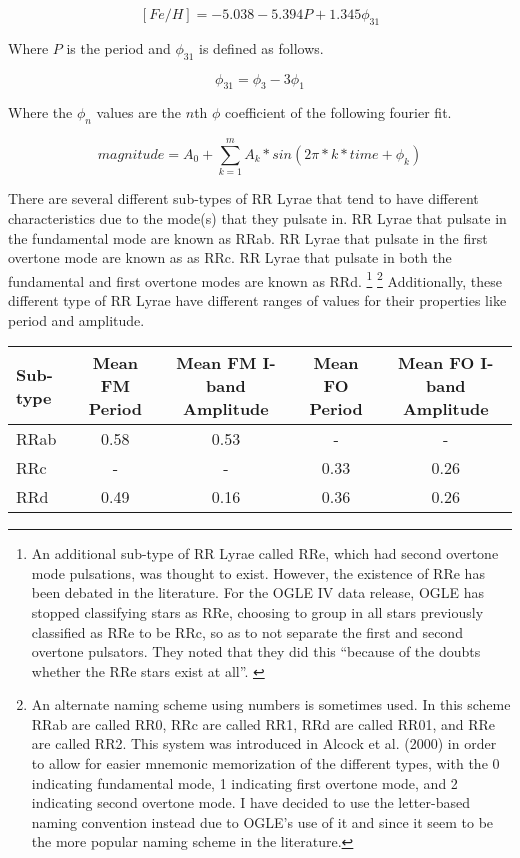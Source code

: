 \documentclass[]{article}
\begin{document}
$$
[Fe/H] = -5.038 - 5.394 P + 1.345 \phi_{31}
$$

Where $P$ is the period and $\phi_{31}$ is defined as follows. \cite{bhardwaj_2018}

$$
\phi_{31} = \phi_{3} - 3\phi_{1}
$$

Where the $\phi_{n}$ values are the $n$th $\phi$ coefficient of the following fourier fit.

$$
magnitude = A_{0} + \sum_{k=1}^{m} A_k * sin(2\pi * k * time + \phi_{k})
$$

There are several different sub-types of RR Lyrae that tend to have different characteristics due to the mode(s) that they pulsate in. \cite{chen_2013} RR Lyrae that pulsate in the fundamental mode are known as RRab. RR Lyrae that pulsate in the first overtone mode are known as as RRc. RR Lyrae that pulsate in both the fundamental and first overtone modes are known as RRd. \footnote{An additional sub-type of RR Lyrae called RRe, which had second overtone mode pulsations, was thought to exist. However, the existence of RRe has been debated in the literature. \cite{chen_2013} For the OGLE IV data release, OGLE has stopped classifying stars as RRe, choosing to group in all stars previously classified as RRe to be RRc, so as to not separate the first and second overtone pulsators. They noted that they did this ``because of the doubts whether the RRe stars exist at all''. \cite{soszynski_2016}} \footnote{An alternate naming scheme using numbers is sometimes used. In this scheme RRab are called RR0, RRc are called RR1, RRd are called RR01, and RRe are called RR2. This system was introduced in Alcock et al. (2000) in order to allow for easier mnemonic memorization of the different types, with the 0 indicating fundamental mode, 1 indicating first overtone mode, and 2 indicating second overtone mode. \cite{chen_2013} I have decided to use the letter-based naming convention instead due to OGLE's use of it and since it seem to be the more popular naming scheme in the literature.} \cite{chen_2013} Additionally, these different type of RR Lyrae have different ranges of values for their properties like period and amplitude.


\begin{center}
\begin{tabular}{|l|c|c|c|c|}
	\hline
	Sub-type & Mean FM Period & Mean FM I-band Amplitude & Mean FO Period & Mean FO I-band Amplitude \\
	\hline
	RRab & 0.58 & 0.53 & - & - \\
	RRc & - & - & 0.33 & 0.26 \\
	RRd & 0.49 & 0.16 & 0.36 & 0.26 \\
	\hline
\end{tabular}
\end{center}
\end{document}
